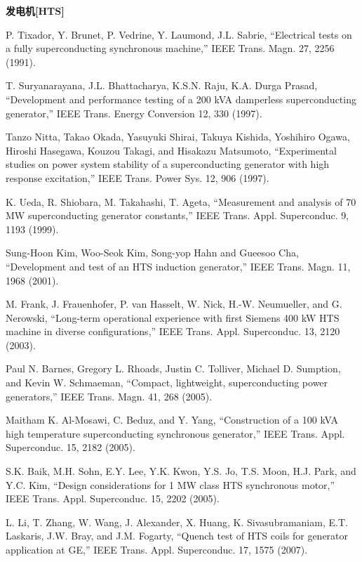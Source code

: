 \noindent \textbf{发电机[HTS] }

\noindent [9.63] P. Tixador, Y. Brunet, P. Vedrine, Y. Laumond, J.L. Sabrie, ``Electrical tests on a
fully superconducting synchronous machine,” IEEE Trans. Magn. 27, 2256 (1991).

\noindent [9.64] T. Suryanarayana, J.L. Bhattacharya, K.S.N. Raju, K.A. Durga Prasad, ``Development
and performance testing of a 200 kVA damperless superconducting generator,”
IEEE Trans. Energy Conversion 12, 330 (1997).

\noindent [9.65] Tanzo Nitta, Takao Okada, Yasuyuki Shirai, Takuya Kishida, Yoshihiro Ogawa,
Hiroshi Hasegawa, Kouzou Takagi, and Hisakazu Matsumoto, ``Experimental studies
on power system stability of a superconducting generator with high response
excitation,” IEEE Trans. Power Sys. 12, 906 (1997).

\noindent [9.66] K. Ueda, R. Shiobara, M. Takahashi, T. Ageta, ``Measurement and analysis of 70
MW superconducting generator constants,” IEEE Trans. Appl. Superconduc. 9,
1193 (1999).

\noindent [9.67] Sung-Hoon Kim, Woo-Seok Kim, Song-yop Hahn and Gueesoo Cha, ``Development
and test of an HTS induction generator,” IEEE Trans. Magn. 11, 1968 (2001).

\noindent [9.68] M. Frank, J. Frauenhofer, P. van Hasselt, W. Nick, H.-W. Neumueller, and G. Nerowski,
``Long-term operational experience with first Siemens 400 kW HTS machine
in diverse configurations,” IEEE Trans. Appl. Superconduc. 13, 2120 (2003).

\noindent [9.69] Paul N. Barnes, Gregory L. Rhoads, Justin C. Tolliver, Michael D. Sumption,
and Kevin W. Schmaeman, ``Compact, lightweight, superconducting power generators,”
IEEE Trans. Magn. 41, 268 (2005).

\noindent [9.70] Maitham K. Al-Mosawi, C. Beduz, and Y. Yang, ``Construction of a 100 kVA high
temperature superconducting synchronous generator,” IEEE Trans. Appl. Superconduc.
15, 2182 (2005).

\noindent [9.71] S.K. Baik, M.H. Sohn, E.Y. Lee, Y.K. Kwon, Y.S. Jo, T.S. Moon, H.J. Park, and
Y.C. Kim, ``Design considerations for 1 MW class HTS synchronous motor,” IEEE
Trans. Appl. Superconduc. 15, 2202 (2005).

\noindent [9.72] L. Li, T. Zhang, W. Wang, J. Alexander, X. Huang, K. Sivasubramaniam, E.T.
Laskaris, J.W. Bray, and J.M. Fogarty, ``Quench test of HTS coils for generator
application at GE,” IEEE Trans. Appl. Superconduc. 17, 1575 (2007).

